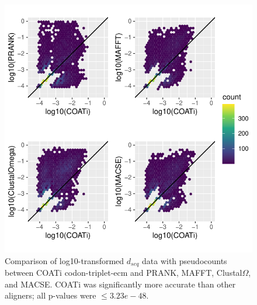 \begin{figure}[!ht]
    \centering
    \includegraphics{chapter2/appendix-figures/dseq_plots_tri-ecm.pdf} 
    \caption[$d_{seq}$ Triplet-ECM]{Comparison of log10-transformed $d_{seq}$ data with pseudocounts between COATi codon-triplet-ecm and PRANK, MAFFT, Clustal$\Omega$, and MACSE. COATi was significantly more accurate than other aligners; all p-values were $\leq 3.23e-48$.}
    \label{fig:dseq-tri-ecm} 
\end{figure}

